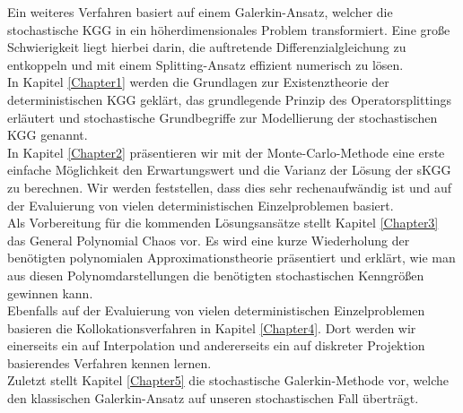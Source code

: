 Ein weiteres Verfahren basiert auf einem Galerkin-Ansatz, welcher die stochastische KGG in ein höherdimensionales Problem transformiert. Eine große Schwierigkeit liegt hierbei darin, die auftretende Differenzialgleichung zu entkoppeln und mit einem Splitting-Ansatz effizient numerisch zu lösen.\\[0.2cm]
In Kapitel \ref{Chapter1} werden die Grundlagen zur Existenztheorie der deterministischen KGG geklärt, das grundlegende Prinzip des Operatorsplittings erläutert und stochastische Grundbegriffe zur Modellierung der stochastischen KGG genannt.\\
In Kapitel \ref{Chapter2} präsentieren wir mit der Monte-Carlo-Methode eine erste einfache Möglichkeit den Erwartungswert und die Varianz der Lösung der sKGG zu berechnen. Wir werden feststellen, dass dies sehr rechenaufwändig ist und auf der Evaluierung von vielen deterministischen Einzelproblemen basiert.\\
Als Vorbereitung für die kommenden Lösungsansätze stellt Kapitel \ref{Chapter3} das General Polynomial Chaos vor. Es wird eine kurze Wiederholung der benötigten polynomialen Approximationstheorie präsentiert und erklärt, wie man aus diesen Polynomdarstellungen die benötigten stochastischen Kenngrößen gewinnen kann.\\
Ebenfalls auf der Evaluierung von vielen deterministischen Einzelproblemen basieren die Kollokationsverfahren in Kapitel \ref{Chapter4}. Dort werden wir einerseits ein auf Interpolation und andererseits ein auf diskreter Projektion basierendes Verfahren kennen lernen.\\
Zuletzt stellt Kapitel \ref{Chapter5} die stochastische Galerkin-Methode vor, welche den klassischen Galerkin-Ansatz auf unseren stochastischen Fall überträgt.